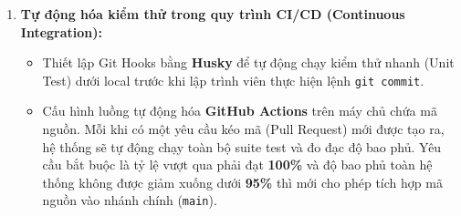 \begin{enumerate}
    \item \textbf{Tự động hóa kiểm thử trong quy trình CI/CD (Continuous Integration):}
    \begin{itemize}
        \item Thiết lập Git Hooks bằng \textbf{Husky} để tự động chạy kiểm thử nhanh (Unit Test) dưới local trước khi lập trình viên thực hiện lệnh \texttt{git commit}.
        \item Cấu hình luồng tự động hóa \textbf{GitHub Actions} trên máy chủ chứa mã nguồn. Mỗi khi có một yêu cầu kéo mã (Pull Request) mới được tạo ra, hệ thống sẽ tự động chạy toàn bộ suite test và đo đạc độ bao phủ. Yêu cầu bắt buộc là tỷ lệ vượt qua phải đạt \textbf{100\%} và độ bao phủ toàn hệ thống không được giảm xuống dưới \textbf{95\%} thì mới cho phép tích hợp mã nguồn vào nhánh chính (\texttt{main}).
    \end{itemize}
\end{enumerate}

